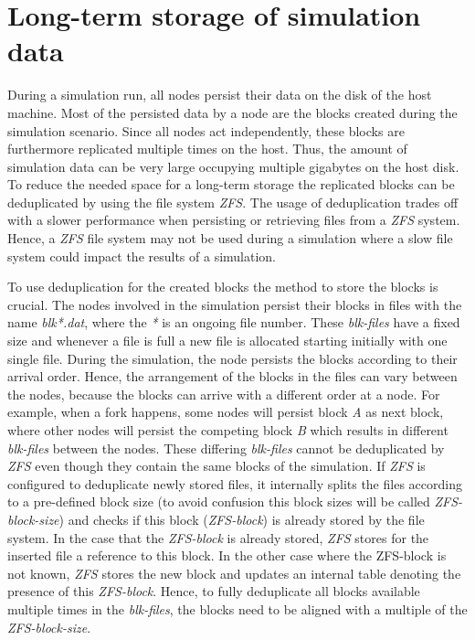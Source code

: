 \section{Long-term storage of simulation data}

During a simulation run, all nodes persist their data on the disk of the host machine.
Most of the persisted data by a node are the blocks created during the simulation scenario.
Since all nodes act independently, these blocks are furthermore replicated multiple times on the host.
Thus, the amount of simulation data can be very large occupying multiple gigabytes on the host disk.
To reduce the needed space for a long-term storage the replicated blocks can be deduplicated by using the file system \textit{ZFS}.
The usage of deduplication trades off with a slower performance when persisting or retrieving files from a \textit{ZFS} system.
Hence, a \textit{ZFS} file system may not be used during a simulation where a slow file system could impact the results of a simulation.

To use deduplication for the created blocks the method to store the blocks is crucial.
The nodes involved in the simulation persist their blocks in files with the name \textit{blk*.dat}, where the \textit{*} is an ongoing file number.
These \textit{blk-files} have a fixed size and whenever a file is full a new file is allocated starting initially with one single file.
During the simulation, the node persists the blocks according to their arrival order.
Hence, the arrangement of the blocks in the files can vary between the nodes, because the blocks can arrive with a different order at a node.
For example, when a fork happens, some nodes will persist block \textit{A} as next block, where other nodes will persist the competing block \textit{B} which results in different \textit{blk-files} between the nodes.
These differing \textit{blk-files} cannot be deduplicated by \textit{ZFS} even though they contain the same blocks of the simulation.
If \textit{ZFS} is configured to deduplicate newly stored files, it internally splits the files according to a pre-defined block size (to avoid confusion this block sizes will be called \textit{ZFS-block-size}) and checks if this block (\textit{ZFS-block}) is already stored by the file system.
In the case that the \textit{ZFS-block} is already stored, \textit{ZFS} stores for the inserted file a reference to this block.
In the other case where the ZFS-block is not known, \textit{ZFS} stores the new block and updates an internal table denoting the presence of this \textit{ZFS-block}.
Hence, to fully deduplicate all blocks available multiple times in the \textit{blk-files}, the blocks need to be aligned with a multiple of the \textit{ZFS-block-size}.

